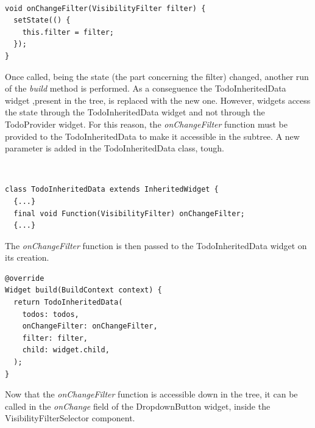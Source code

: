 \mbox{}\\


 \mbox{}

\begin{verbatim}
void onChangeFilter(VisibilityFilter filter) {
  setState(() {
    this.filter = filter;
  });
}
\end{verbatim}

Once called, being the state (the part concerning the filter) changed, another run of the \textit{build} method is performed. As a conseguence the TodoInheritedData widget ,present in the tree, is replaced with the new one.
However, widgets access the state through the TodoInheritedData widget and not through the TodoProvider widget. For this reason,
the \textit{onChangeFilter   }function must be provided to the TodoInheritedData to make it accessible in the subtree. A new parameter is added in the TodoInheritedData class, tough.


\mbox{}\\

\begin{verbatim}
class TodoInheritedData extends InheritedWidget {
  {...}
  final void Function(VisibilityFilter) onChangeFilter;
  {...}
\end{verbatim}

The \textit{onChangeFilter} function is then passed to the TodoInheritedData widget on its creation.
 

\begin{verbatim}
@override
Widget build(BuildContext context) {
  return TodoInheritedData(
    todos: todos,
    onChangeFilter: onChangeFilter,
    filter: filter,
    child: widget.child,
  );
}

\end{verbatim}
 
Now that the \textit{onChangeFilter   }function is accessible down in the tree, it can be called in the \textit{onChange }field of the DropdownButton widget, inside the VisibilityFilterSelector component.
\mbox{}\\



